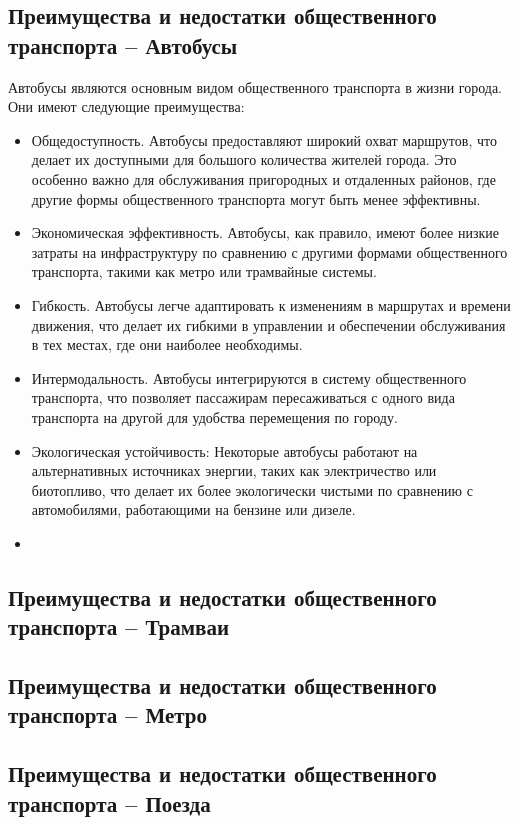 \subsection{Преимущества и недостатки общественного транспорта -- Автобусы}

Автобусы являются основным видом общественного транспорта в жизни города. Они имеют следующие преимущества:
\begin{itemize}
	\item Общедоступность. Автобусы предоставляют широкий охват маршрутов, что делает их доступными для большого количества жителей города. Это особенно важно для обслуживания пригородных и отдаленных районов, где другие формы общественного транспорта могут быть менее эффективны.
	\item Экономическая эффективность. Автобусы, как правило, имеют более низкие затраты на инфраструктуру по сравнению с другими формами общественного транспорта, такими как метро или трамвайные системы.
	\item Гибкость. Автобусы легче адаптировать к изменениям в маршрутах и времени движения, что делает их гибкими в управлении и обеспечении обслуживания в тех местах, где они наиболее необходимы.
	\item Интермодальность. Автобусы интегрируются в систему общественного транспорта, что позволяет пассажирам пересаживаться с одного вида транспорта на другой для удобства перемещения по городу.
	\item Экологическая устойчивость: Некоторые автобусы работают на альтернативных источниках энергии, таких как электричество или биотопливо, что делает их более экологически чистыми по сравнению с автомобилями, работающими на бензине или дизеле.
	\item
\end{itemize}

\subsection{Преимущества и недостатки общественного транспорта -- Трамваи}


\subsection{Преимущества и недостатки общественного транспорта -- Метро}


\subsection{Преимущества и недостатки общественного транспорта -- Поезда}


